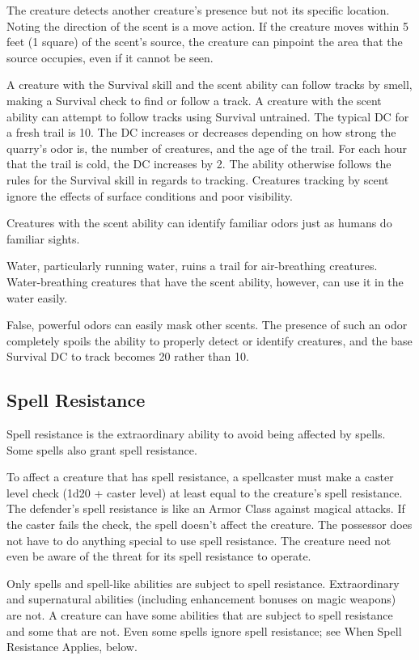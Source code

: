 The creature detects another creature's presence but not its specific location. Noting the direction of the scent is a move action. If the creature moves within 5 feet (1 square) of the scent's source, the creature can pinpoint the area that the source occupies, even if it cannot be seen.
				
A creature with the Survival skill and the scent ability can follow tracks by smell, making a Survival check to find or follow a track. A creature with the scent ability can attempt to follow tracks using Survival untrained. The typical DC for a fresh trail is 10. The DC increases or decreases depending on how strong the quarry's odor is, the number of creatures, and the age of the trail. For each hour that the trail is cold, the DC increases by 2. The ability otherwise follows the rules for the Survival skill in regards to tracking. Creatures tracking by scent ignore the effects of surface conditions and poor visibility.
				
Creatures with the scent ability can identify familiar odors just as humans do familiar sights.
				
Water, particularly running water, ruins a trail for air-breathing creatures. Water-breathing creatures that have the scent ability, however, can use it in the water easily.
				
False, powerful odors can easily mask other scents. The presence of such an odor completely spoils the ability to properly detect or identify creatures, and the base Survival DC to track becomes 20 rather than 10.
				
\subsection{Spell Resistance}

				
Spell resistance is the extraordinary ability to avoid being affected by spells. Some spells also grant spell resistance.
				
To affect a creature that has spell resistance, a spellcaster must make a caster level check (1d20 + caster level) at least equal to the creature's spell resistance. The defender's spell resistance is like an Armor Class against magical attacks. If the caster fails the check, the spell doesn't affect the creature. The possessor does not have to do anything special to use spell resistance. The creature need not even be aware of the threat for its spell resistance to operate.
				
Only spells and spell-like abilities are subject to spell resistance. Extraordinary and supernatural abilities (including enhancement bonuses on magic weapons) are not. A creature can have some abilities that are subject to spell resistance and some that are not. Even some spells ignore spell resistance; see When Spell Resistance Applies, below. 
				

